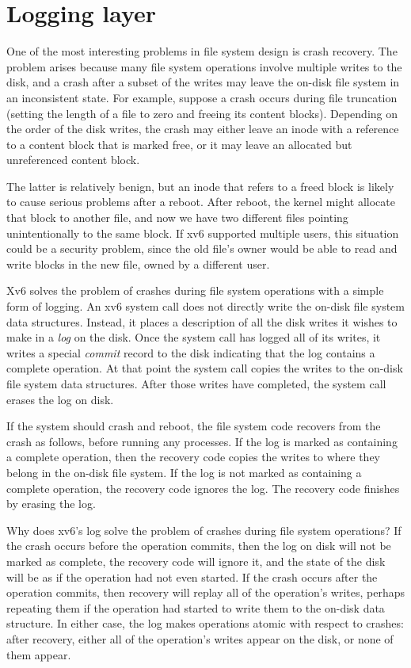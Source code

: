 \section{Logging layer}

One of the most interesting problems in file system design is crash
recovery. The problem arises because many file system operations
involve multiple writes to the disk, and a crash after a subset of the
writes may leave the on-disk file system in an inconsistent state. For
example, suppose a crash occurs during file truncation (setting
the length of a file to zero and freeing its content blocks).
Depending on the order of the disk writes, the crash 
may either leave an inode with a reference
to a content block that is marked free,
or it may leave an allocated but unreferenced content block.

The latter is relatively benign, but an inode that refers to a freed
block is likely to cause serious problems after a reboot.  After reboot, the
kernel might allocate that block to another file, and now we have two different
files pointing unintentionally to the same block.  If xv6 supported
multiple users, this situation could be a security problem, since the
old file's owner would be able to read and write blocks in the
new file, owned by a different user.

Xv6 solves the problem of crashes during file system operations with a
simple form of logging. An xv6 system call does not directly write
the on-disk file system data structures. Instead, it places a
description of all the disk writes it wishes to make in a 
\textit{log} 
on the disk. Once the system call has logged all of its writes, it writes a
special 
\textit{commit}
record to the disk indicating that the log contains
a complete operation. At that point the system call copies the writes
to the on-disk file system data structures. After those writes have
completed, the system call erases the log on disk.

If the system should crash and reboot, the file system code recovers
from the crash as follows, before running any processes. If the log is
marked as containing a complete operation, then the recovery code
copies the writes to where they belong in the on-disk file system. If
the log is not marked as containing a complete operation, the recovery
code ignores the log.  The recovery code finishes by erasing
the log.

Why does xv6's log solve the problem of crashes during file system
operations? If the crash occurs before the operation commits, then the
log on disk will not be marked as complete, the recovery code will
ignore it, and the state of the disk will be as if the operation had
not even started. If the crash occurs after the operation commits,
then recovery will replay all of the operation's writes, perhaps
repeating them if the operation had started to write them to the
on-disk data structure. In either case, the log makes operations
atomic with respect to crashes: after recovery, either all of the
operation's writes appear on the disk, or none of them appear.
